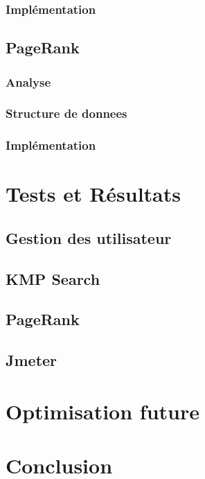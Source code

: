 \documentclass[11pt,english]{article}
\begin{document}
{    \subsubsection{Implémentation}

    \subsection{PageRank}

    \subsubsection{Analyse}

    \subsubsection{Structure de donnees}

    \subsubsection{Implémentation}

    \section{Tests et Résultats}

    \subsection{Gestion des utilisateur}

    \subsection{KMP Search}

    \subsection{PageRank}

    \subsection{Jmeter}

    \section{Optimisation future}

    \section{Conclusion}
}
\end{document}
